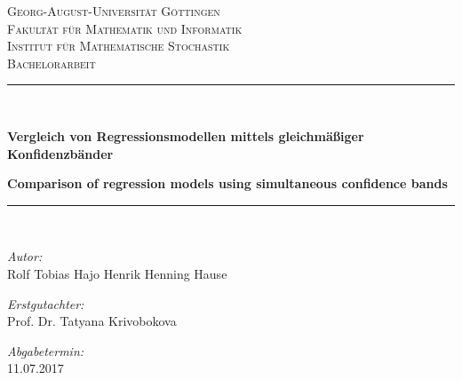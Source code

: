 \documentclass[12pt,a4paper]{article}
\theoremstyle{definition}
\theoremstyle{definition}
\theoremstyle{definition}
\theoremstyle{definition}
\begin{document}
\begin{titlepage}

\begin{center}



\textsc{\LARGE Georg-August-Universität Göttingen}\\
\textsc{Fakultät für Mathematik und Informatik}\\
\textsc{Institut für Mathematische Stochastik}\\[1.5cm]


\textsc{\Large Bachelorarbeit}\\[0.5cm]


\newcommand{\HRule}{\rule{\linewidth}{0.5mm}}
\HRule \\[0.4cm]
\begin{onehalfspace}
{ \LARGE \bfseries  Vergleich von Regressionsmodellen mittels gleichmäßiger Konfidenzbänder  }\\[0.4cm]
\end{onehalfspace}
{ \large \bfseries Comparison of regression models using simultaneous confidence bands}\\[0.4cm]

\HRule \\[1cm]


\begin{minipage}{0.4\textwidth}
\begin{flushleft} \large
\emph{Autor:}\\
Rolf Tobias Hajo Henrik Henning Hause\\
\end{flushleft}
\end{minipage}
\hfill
\begin{minipage}{0.4\textwidth}
\begin{flushright} \large
\emph{Erstgutachter:} \\
Prof. Dr. Tatyana Krivobokova\\
\end{flushright}
\end{minipage}
\vspace{0.3cm}

\begin{minipage}{0.4\textwidth}
\begin{flushleft} \large
\emph{Abgabetermin:}\\
11.07.2017\\


\end{flushleft}
\end{minipage}
\end{center}
\end{titlepage}
\end{document}
